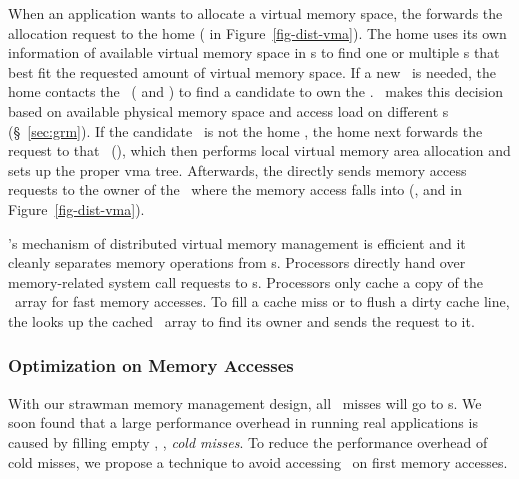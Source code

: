 \documentclass[10pt,times,twocolumn]{z2-article}
\newcommand*\circled[1]{\tikz[baseline=-3pt]{
            \node[shape=circle,draw,inner sep=1pt,minimum size=10pt] (char) {\small #1};}}
\begin{document}
{{{{{{{When an application wants to allocate a virtual memory space,
the \pcomponent{} forwards the allocation request 
to the home \mcomponent{} (\circled{1} in Figure~\ref{fig-dist-vma}).
The home \mcomponent{} uses its own information of available virtual memory space in \vregion{}s
to find one or multiple \vregion{}s that best fit the requested amount of virtual memory space.
If a new \vregion\ is needed, the home \mcomponent{} contacts the \gmm\ (\circled{2} and \circled{3}) 
to find a candidate \mcomponent{} to own the \vregion.
\gmm\ makes this decision based on available physical memory space and access load on different \mcomponent{}s (\S~\ref{sec:grm}).
If the candidate \mcomponent\ is not the home \mcomponent{}, the home \mcomponent{} next forwards the request to that \mcomponent\ (\circled{4}),
which then performs local virtual memory area allocation and sets up the proper vma tree. 
Afterwards, the \pcomponent{} directly sends memory access requests to the owner of the \vregion\ where the memory access falls into
(\eg, \circled{a} and \circled{c} in Figure~\ref{fig-dist-vma}).


\lego's mechanism of distributed virtual memory management is efficient and it cleanly separates memory operations from \pcomponent{}s.
Processors directly hand over memory-related system call requests to \mcomponent{}s.
Processors only cache a copy of the \vregion\ array for fast memory accesses.
To fill a cache miss or to flush a dirty cache line, 
the \pcomponent{} looks up the cached \vregion\ array to find its owner \mcomponent{} and sends the request to it.

\subsubsection{Optimization on Memory Accesses}
\label{sec:zerofill}
With our strawman memory management design, 
all \excache\ misses will go to \mcomponent{}s.
We soon found that a large performance overhead in running real applications 
is caused by filling empty \excache, \ie, {\em cold misses}.
To reduce the performance overhead of cold misses, we propose a technique 
to avoid accessing \mcomponent\ on first memory accesses.

}}}}}}}
\end{document}
